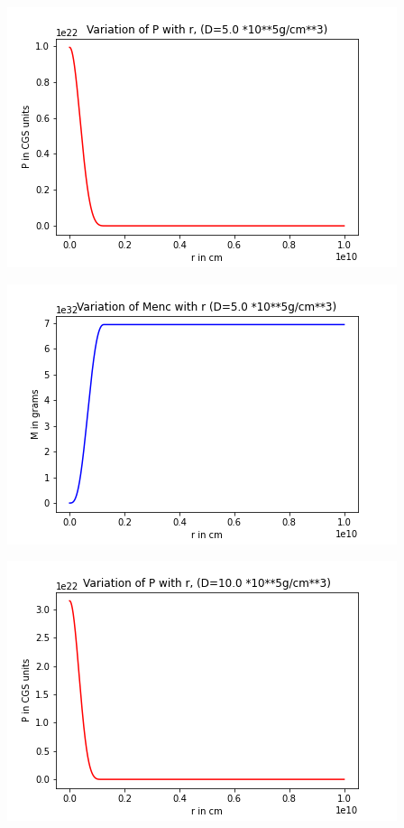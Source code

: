 \documentclass{article}
\begin{document}
\begin{center}
\begin{multicols}{2}
\end{multicols}
\begin{multicols}{2}
	\begin{center}
        \includegraphics[scale=0.3]{Images/Pr_pb1_3}
        \end{center}
\columnbreak
       \includegraphics[scale=0.3]{Images/Mr_pb1_3}
\end{multicols}
\begin{multicols}{2}
	\begin{center}
        \includegraphics[scale=0.3]{Images/Pr_pb1_4}

\end{center}
\end{multicols}
\end{center}
\end{document}

